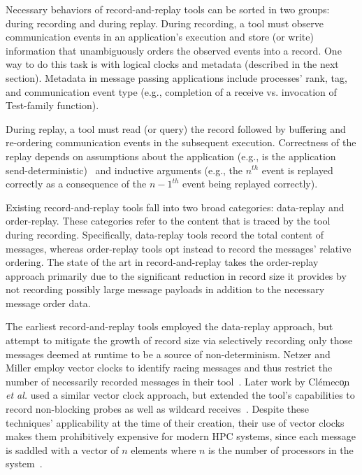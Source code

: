 Necessary behaviors of record-and-replay tools can be sorted in two
groups: during recording and during replay. During recording, a tool
must observe communication events in an application's execution and
store (or write) information that unambiguously orders the observed
events into a record. One way to do this task is with logical clocks
and metadata (described in the next section). Metadata in message
passing applications include processes' rank, tag, and communication
event type (e.g., completion of a receive vs. invocation of
Test-family function).

During replay, a tool must read (or query) the record followed by
buffering and re-ordering communication events in the subsequent
execution. Correctness of the replay depends on assumptions about the 
application (e.g., is the application send-deterministic)~\cite{CommunicationDeterminism:Cappello:2010}
and inductive arguments (e.g., the $n^{th}$ event is replayed correctly as a
consequence of the $n-1^{th}$ event being replayed correctly).

Existing record-and-replay tools fall into two broad categories:
data-replay and order-replay. These categories refer to the content
that is traced by the tool during recording.  Specifically,
data-replay tools record the total content of messages, whereas
order-replay tools opt instead to record the messages' relative
ordering. The state of the art in record-and-replay takes the
order-replay approach primarily due to the significant reduction in
record size it provides by not recording possibly large message
payloads in addition to the necessary message order data.

The earliest record-and-replay tools employed the data-replay
approach, but attempt to mitigate the growth of record size via
selectively recording only those messages deemed at runtime to be a
source of non-determinism.  Netzer and Miller employ vector clocks to
identify racing messages and thus restrict the number of necessarily
recorded messages in their tool~\cite{OptimalTracing:Netzer:1992}.
Later work by Cl\'emec\c on \textit{et al.} used a similar vector
clock approach, but extended the tool's capabilities to record
non-blocking probes as well as wildcard
receives~\cite{RaceDetection:Clemencon:1995}. Despite these
techniques' applicability at the time of their creation, their use of
vector clocks makes them prohibitively expensive for modern HPC
systems, since each message is saddled with a vector of $n$ elements
where $n$ is the number of processors in the
system~\cite{VectorClocksI:Fidge:1988}.

